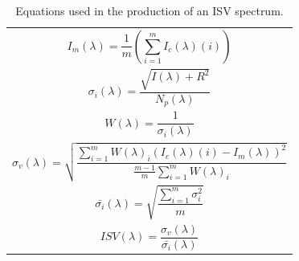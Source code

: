 

\begin{table}[]
    \centering
    \begin{tabular}{|c|}
    \hline
    \vbox{\begin{equation}I_{m}(\lambda) = \frac{1}{m}(\sum\limits_{i=1}^m I_{c}(\lambda)(i))\label{eqMean}\end{equation}}\\
    \vbox{\begin{equation}\sigma_{i}(\lambda) = \frac{\sqrt{I(\lambda)+R^2}}{N_p(\lambda)}\label{eqPhoton}\end{equation}}\\
    \vbox{\begin{equation}W(\lambda) = \frac{1}{\sigma_{i}(\lambda)}\label{eqWeight}\end{equation}}\\
    \vbox{\begin{equation}\sigma_{v}(\lambda) =  \sqrt{\frac{\sum\limits_{i=1}^m W(\lambda)_{i}(I_{c}(\lambda)(i)-I_{m}(\lambda))^2}{\frac{m-1}{m}\sum\limits_{i=1}^m W(\lambda)_{i}}}\label{eqSigV}\end{equation}}\\
    \vbox{\begin{equation}\bar{\sigma_i}(\lambda) = \sqrt{\frac{\sum\limits_{i=1}^m\sigma_{i}^2}{m}}\label{eqSigI}\end{equation}}\\
    \vbox{\begin{equation}ISV(\lambda) = \frac{\sigma_{v}(\lambda)}{\bar{\sigma_i}(\lambda)}\label{eqISV2}\end{equation}}\\
    \hline
    \end{tabular}
    \caption{Equations used in the production of an ISV spectrum.}
    \label{tabISVeqautions}
\end{table}
